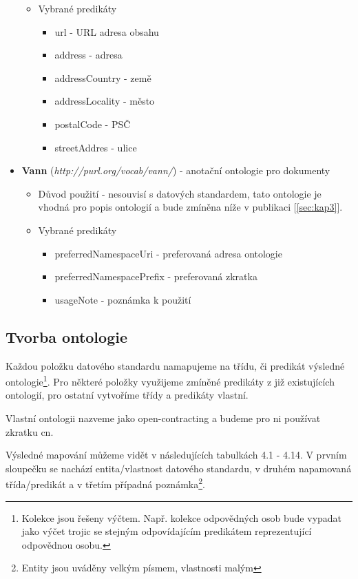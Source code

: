 \begin{itemize}
\begin{itemize}
\begin{itemize}
		\end{itemize}
	\item Vybrané predikáty
		\begin{itemize}
		\item url - URL adresa obsahu
		\item address - adresa
		\item addressCountry - země
		\item addressLocality - město
		\item postalCode - PSČ
		\item streetAddres - ulice
		\end{itemize}
	\end{itemize}
\item \textbf{Vann} (\textit{http://purl.org/vocab/vann/}) - anotační ontologie pro dokumenty 
	\begin{itemize}
	\item Důvod použití - nesouvisí s datových standardem, tato ontologie je vhodná pro popis ontologií a bude zmíněna níže v publikaci [\ref{sec:kap3}].
	\item Vybrané predikáty
		\begin{itemize}
		\item preferredNamespaceUri - preferovaná adresa ontologie
		\item preferredNamespacePrefix - preferovaná zkratka
		\item usageNote - poznámka k použití
		\end{itemize}
	\end{itemize}

\end{itemize}

\subsection{Tvorba ontologie}

Každou položku datového standardu namapujeme na třídu, či predikát výsledné ontologie\footnote{Kolekce jsou řešeny výčtem. Např. kolekce odpovědných osob bude vypadat jako výčet trojic se stejným odpovídajícím predikátem reprezentující odpovědnou osobu.}. Pro některé položky využijeme zmíněné predikáty z již existujících ontologií, pro ostatní vytvoříme třídy a predikáty vlastní.

Vlastní ontologii nazveme jako open-contracting a budeme pro ni používat zkratku cn.  

Výsledné mapování můžeme vidět v následujících tabulkách 4.1 - 4.14. V prvním sloupečku se nachází entita/vlastnost datového standardu, v druhém napamovaná třída/predikát a v třetím případná poznámka\footnote{Entity jsou uváděny velkým písmem, vlastnosti malým}.

